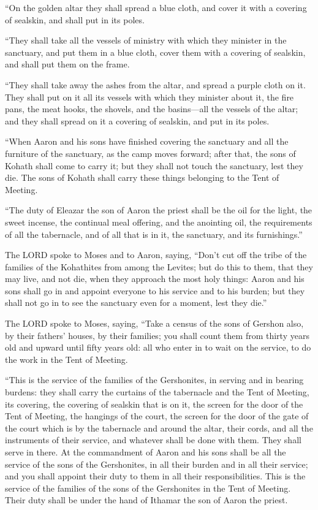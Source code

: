 \myverse{}“On the golden altar they shall spread a blue cloth, and cover
it with a covering of sealskin, and shall put in its poles.


\myverse{}“They shall take all the vessels of ministry with which they
minister in the sanctuary, and put them in a blue cloth, cover them with a covering of sealskin, and shall
put them on the frame.


\myverse{}“They shall take away the ashes from the altar, and spread a
purple cloth on it.
\myverse{}They shall put on it all its vessels with which they minister about it, the
fire pans, the meat hooks, the shovels, and the basins—all the vessels of the altar; and they shall spread
on it a covering of sealskin, and put in its poles.


\myverse{}“When Aaron and his sons have finished covering the sanctuary
and all the furniture of the sanctuary, as the camp moves forward; after that, the sons of Kohath shall
come to carry it; but they shall not touch the sanctuary, lest they die. The sons of Kohath shall carry
these things belonging to the Tent of Meeting.


\myverse{}“The duty of Eleazar the son of Aaron the priest shall be the
oil for the light, the sweet incense, the continual meal offering, and the anointing oil, the requirements
of all the tabernacle, and of all that is in it, the sanctuary, and its furnishings.”


\myverse{}The LORD spoke to Moses and to Aaron, saying,
\myverse{}“Don’t cut off the tribe of the families of the Kohathites from among the
Levites;
\myverse{}but do this to them, that they may live, and not die, when they approach the
most holy things: Aaron and his sons shall go in and appoint everyone to his service and to his burden;
\myverse{}but they shall not go in to see the sanctuary even for a moment, lest they
die.”


\myverse{}The LORD spoke to Moses, saying,
\myverse{}“Take a census of the sons of Gershon also, by their fathers’ houses, by their
families;
\myverse{}you shall count them from thirty years old and upward until fifty years old:
all who enter in to wait on the service, to do the work in the Tent of Meeting.


\myverse{}“This is the service of the families of the Gershonites, in serving
and in bearing burdens:
\myverse{}they shall carry the curtains of the tabernacle and the Tent of Meeting, its
covering, the covering of sealskin that is on it, the screen for the door of the Tent of Meeting,
\myverse{}the hangings of the court, the screen for the door of the gate of the court
which is by the tabernacle and around the altar, their cords, and all the instruments of their service,
and whatever shall be done with them. They shall serve in there.
\myverse{}At the commandment of Aaron and his sons shall be all the service of the sons
of the Gershonites, in all their burden and in all their service; and you shall appoint their duty to
them in all their responsibilities.
\myverse{}This is the service of the families of the sons of the Gershonites in the
Tent of Meeting. Their duty shall be under the hand of Ithamar the son of Aaron the priest.


